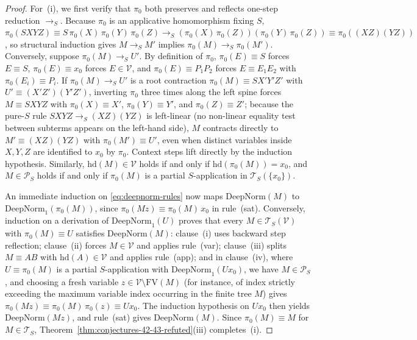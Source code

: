 \documentclass[11pt,reqno]{amsart}
\numberwithin{equation}{section}
\theoremstyle{plain}
\theoremstyle{definition}
\theoremstyle{remark}
\newcommand{\TS}{\mathcal{T}_S}
\newcommand{\TSV}{\mathcal{T}_S(\mathcal{V})}
\newcommand{\redS}{\to_S}
\begin{document}
\begin{proof}
For~(i), we first verify that $\pi_0$ both preserves and reflects one-step reduction $\redS$. Because $\pi_0$ is an applicative homomorphism fixing $S$, $\pi_0(S X Y Z) \equiv S\,\pi_0(X)\,\pi_0(Y)\,\pi_0(Z) \redS (\pi_0(X)\,\pi_0(Z))(\pi_0(Y)\,\pi_0(Z)) \equiv \pi_0((X Z)(Y Z))$, so structural induction gives $M \redS M'$ implies $\pi_0(M) \redS \pi_0(M')$. Conversely, suppose $\pi_0(M) \redS U'$. By definition of $\pi_0$, $\pi_0(E) \equiv S$ forces $E \equiv S$, $\pi_0(E) \equiv x_0$ forces $E \in \mathcal{V}$, and $\pi_0(E) \equiv P_1 P_2$ forces $E \equiv E_1 E_2$ with $\pi_0(E_i) \equiv P_i$. If $\pi_0(M) \redS U'$ is a root contraction $\pi_0(M) \equiv S X' Y' Z'$ with $U' \equiv (X' Z')(Y' Z')$, inverting $\pi_0$ three times along the left spine forces $M \equiv S X Y Z$ with $\pi_0(X) \equiv X'$, $\pi_0(Y) \equiv Y'$, and $\pi_0(Z) \equiv Z'$; because the pure-$S$ rule $S X Y Z \redS (X Z)(Y Z)$ is left-linear (no non-linear equality test between subterms appears on the left-hand side), $M$ contracts directly to $M' \equiv (X Z)(Y Z)$ with $\pi_0(M') \equiv U'$, even when distinct variables inside $X, Y, Z$ are identified to $x_0$ by $\pi_0$. Context steps lift directly by the induction hypothesis. Similarly, $\mathrm{hd}(M) \in \mathcal{V}$ holds if and only if $\mathrm{hd}(\pi_0(M)) = x_0$, and $M \in \mathcal{P}_S$ holds if and only if $\pi_0(M)$ is a partial $S$-application in $\TS(\{x_0\})$.

An immediate induction on \eqref{eq:deepnorm-rules} now maps $\mathrm{DeepNorm}(M)$ to $\mathrm{DeepNorm}_1(\pi_0(M))$, since $\pi_0(M z) \equiv \pi_0(M)\,x_0$ in rule~(sat). Conversely, induction on a derivation of $\mathrm{DeepNorm}_1(U)$ proves that every $M \in \TSV$ with $\pi_0(M) \equiv U$ satisfies $\mathrm{DeepNorm}(M)$: clause~(i) uses backward step reflection; clause~(ii) forces $M \in \mathcal{V}$ and applies rule~(var); clause~(iii) splits $M \equiv A B$ with $\mathrm{hd}(A) \in \mathcal{V}$ and applies rule~(app); and in clause~(iv), where $U \equiv \pi_0(M)$ is a partial $S$-application with $\mathrm{DeepNorm}_1(U x_0)$, we have $M \in \mathcal{P}_S$, and choosing a fresh variable $z \in \mathcal{V} \setminus \mathrm{FV}(M)$ (for instance, of index strictly exceeding the maximum variable index occurring in the finite tree $M$) gives $\pi_0(M z) \equiv \pi_0(M)\,\pi_0(z) \equiv U x_0$. The induction hypothesis on $U x_0$ then yields $\mathrm{DeepNorm}(M z)$, and rule~(sat) gives $\mathrm{DeepNorm}(M)$. Since $\pi_0(M) \equiv M$ for $M \in \TS$, Theorem~\ref{thm:conjectures-42-43-refuted}(iii) completes~(i).


\end{proof}
\end{document}
